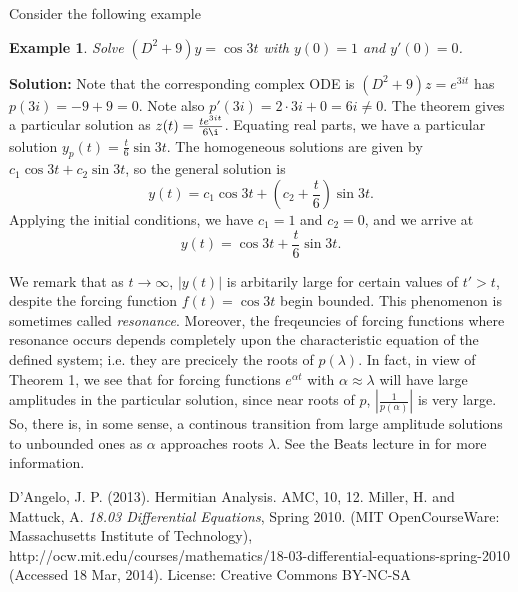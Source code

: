 \documentclass{amsart} %
\newtheorem{ex}{Example}
\begin{document}
Consider the following example
\begin{ex}
  Solve $(D^2 + 9)y = \cos 3t$ with $y(0) = 1$ and $y'(0) = 0$.
\end{ex}
{\bf Solution:}
Note that the corresponding complex ODE is $(D^2 + 9)z = e^{3it}$ has $p(3i) = -9 + 9 =0$.  Note also $p'(3i) = 2\cdot 3i + 0 = 6i \not= 0$.  The theorem gives a particular solution as $z(t) = \frac{ te^{3it} }{ 6\i }$.  Equating real parts, we have a particular solution $y_p(t) = \frac t6 \sin 3t$.  The homogeneous solutions are given by $c_1 \cos 3t + c_2 \sin 3t$, so the general solution is
$$
  y(t) = c_1 \cos 3t + \left(c_2 + \frac t6\right) \sin 3t.
$$
Applying the initial conditions, we have $c_1 = 1$ and $c_2 = 0$, and we arrive at
$$
  y(t) = \cos 3t + \frac t6 \sin 3t.
$$

We remark that as $t\to \infty$, $|y(t)|$ is arbitarily large for certain values of $t' > t$, despite the forcing function $f(t) = \cos 3t$ begin bounded. This phenomenon is sometimes called \emph{resonance}. Moreover, the freqeuncies of forcing functions where resonance occurs depends completely upon the characteristic equation of the defined system; i.e. they are precicely the roots of $p(\lambda)$.  In fact, in view of Theorem 1, we see that for forcing functions $e^{\alpha t}$ with $\alpha \approx \lambda$ will have large amplitudes in the particular solution, since near roots of $p$, $\left| \frac 1{p(\alpha)} \right|$ is very large.  So, there is, in some sense, a continous transition from large amplitude solutions to unbounded ones as $\alpha$ approaches roots $\lambda$.  See the Beats lecture in \cite{mit} for more information.

\begin{thebibliography}{1}
     D'Angelo, J. P. (2013). Hermitian Analysis. AMC, 10, 12.
     Miller, H. and Mattuck, A. \emph{18.03 Differential Equations}, Spring 2010. (MIT OpenCourseWare: Massachusetts Institute of Technology), \\http://ocw.mit.edu/courses/mathematics/18-03-differential-equations-spring-2010\\ (Accessed 18 Mar, 2014). License: Creative Commons BY-NC-SA
    \end{thebibliography}
\end{document}
